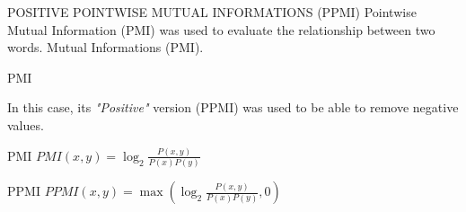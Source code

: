 \begin{frame}{POSITIVE POINTWISE MUTUAL INFORMATIONS (PPMI)}
    Pointwise Mutual Information (PMI) was used to evaluate the relationship between two words.
    Mutual Informations (PMI).
    \begin{block}{PMI}
        \small \emph{\footnotemark[2]}
    \end{block}
    In this case, its \emph{"Positive"} version (PPMI) was used to be able to remove negative values.
    \begin{minipage}{\linewidth}
        \centering
        \begin{minipage}{0.40\linewidth}
            \begin{block}{\centering PMI}
                \centering \small $ PMI(x,y) = \log_2\frac{P(x,y)}{P(x)P(y)} $
            \end{block} 
        \end{minipage}
        \hspace{0.05\linewidth}
        \begin{minipage}{0.50\linewidth}
            \begin{block}{\centering PPMI}
                \centering \small $ PPMI(x,y) = \max(\log_2\frac{P(x,y)}{P(x)P(y)}, 0) $
            \end{block}
        \end{minipage}
    \end{minipage}
\end{frame}

